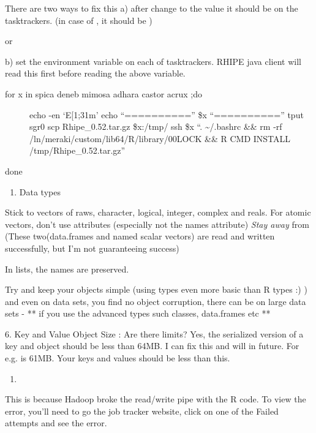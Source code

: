 \documentclass[letterpaper,10pt,english]{manual}
\begin{document}
There are two ways to fix this
a) after  change  to the
value it should be on the tasktrackers.
(in case of , it should be )

or

b) set the environment variable  on each of tasktrackers. RHIPE
java client will read this first before reading the above variable.
\begin{description}
\item[for x in spica deneb mimosa adhara castor acrux ;do]
echo -en `E{[}1;31m'
echo ``=========='' \$x ``==========''
tput sgr0
scp Rhipe\_0.52.tar.gz \$x:/tmp/
ssh \$x ``. \textasciitilde{}/.bashrc \&\& rm -rf /ln/meraki/custom/lib64/R/library/00LOCK \&\& R CMD INSTALL /tmp/Rhipe\_0.52.tar.gz''

\end{description}

done
\begin{enumerate}
\item {} 
Data types

\end{enumerate}

Stick to vectors of raws, character, logical, integer, complex and reals.  For
atomic vectors, don't use attributes (especially not the names attribute) \emph{Stay
away} from  (These two(data.frames and named scalar vectors) are
read and written successfully, but I'm not guaranteeing success)

In lists, the names are preserved.

Try and keep your objects simple (using types even more basic than R types :) ) and even on data sets, you find no object corruption, there can be on large data sets  - ** if you use the advanced types such classes, data.frames etc **

6. Key and Value Object Size : Are there limits?
Yes, the serialized version of a key and object should be less than 64MB. I can fix this and will in future. For e.g.  is 61MB. Your keys and values should be less than this.
\begin{enumerate}
\item {} 

\end{enumerate}

This is because Hadoop broke the read/write pipe with the R code. To view the error, you'll need to go the job tracker website, click on one of the Failed attempts and see the error.
\end{document}
